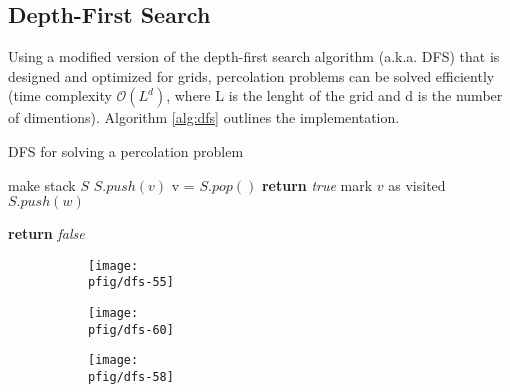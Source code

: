 \documentclass[12pt,a4paper]{article}
\newcommand{\pfig}{../fig/percolation}
\begin{document}
    \subsection{Depth-First Search}
    Using a modified version of the depth-first search algorithm (a.k.a. DFS) that is designed and optimized for grids,
    percolation problems can be solved efficiently (time complexity $\mathcal{O}(L^d)$, where L is the lenght
    of the grid and d is the number of dimentions). Algorithm \ref{alg:dfs} outlines the implementation.
    \begin{algorithm}
        \caption{DFS for solving a percolation problem}
        \label{alg:dfs}
        \begin{algorithmic}[1]
            \parbox[t]{0.75\linewidth}{}
                \State make stack $S$
                        \State $S.push(v)$
                            \State v = $S.pop()$
                                \State \textbf{return} \textit{true}
                                \State mark $v$ as visited
                                \State $S.push(w)$
                                \parbox[t]{0.6\linewidth}{}
                                \EndFor
                            \EndIf
                        \EndWhile
                    \EndIf
                \EndFor
                \State \textbf{return} \textit{false}
            \EndFunction
        \end{algorithmic}
    \end{algorithm}
    \begin{figure}
        \centering
        \begin{subfigure}{0.45\linewidth}
            \centering
            \texttt{[image: \\pfig/dfs-55]}
        \end{subfigure}
        \begin{subfigure}{0.45\linewidth}
            \centering
            \texttt{[image: \\pfig/dfs-60]}
        \end{subfigure}
        \begin{subfigure}{0.45\linewidth}
            \centering
            \texttt{[image: \\pfig/dfs-58]}
        \end{subfigure}
    \end{figure}
    \restoregeometry
\end{document}
